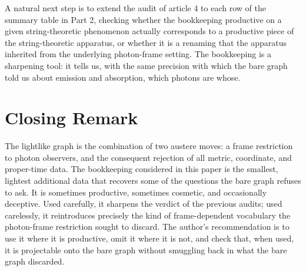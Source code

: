 \documentclass[11pt]{article}
\begin{document}
A natural next step is to extend the audit of article 4 to each row of the summary table in Part 2, checking whether the bookkeeping productive on a given string-theoretic phenomenon actually corresponds to a productive piece of the string-theoretic apparatus, or whether it is a renaming that the apparatus inherited from the underlying photon-frame setting. The bookkeeping is a sharpening tool: it tells us, with the same precision with which the bare graph told us about emission and absorption, which photons are whose.

\section{Closing Remark}

The lightlike graph is the combination of two austere moves: a frame restriction to photon observers, and the consequent rejection of all metric, coordinate, and proper-time data. The bookkeeping considered in this paper is the smallest, lightest additional data that recovers some of the questions the bare graph refuses to ask. It is sometimes productive, sometimes cosmetic, and occasionally deceptive. Used carefully, it sharpens the verdict of the previous audits; used carelessly, it reintroduces precisely the kind of frame-dependent vocabulary the photon-frame restriction sought to discard. The author's recommendation is to use it where it is productive, omit it where it is not, and check that, when used, it is projectable onto the bare graph without smuggling back in what the bare graph discarded.
\end{document}
